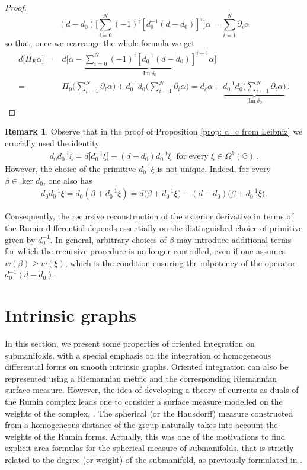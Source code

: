 \documentclass[dvipsnames]{amsart}
\theoremstyle{definition}
\newtheorem{remark}[theorem]{Remark}
\theoremstyle{definition}
\numberwithin{equation}{section}
\newcommand{\G}{\mathbb{G}}
\begin{document}
\begin{proof}
    $$(d-d_0)\big[\sum_{i=0}^N(-1)^i[d_0^{-1}(d-d_0)]^{i}\big]\alpha=\sum_{i=1}^N\partial_i\alpha$$
    so that, once we rearrange the whole formula we get
    \begin{align*}
        d\big[\Pi_E\alpha\big]=&d\bigg[\alpha-\underbrace{\sum_{i=0}^N(-1)^i[d_0^{-1}(d-d_0)]^{i+1}\alpha}_{\operatorname{Im}\delta_0}\bigg]\\=&\Pi_0\bigg(\sum_{i=1}^N\partial_i\alpha\bigg)+d_0^{-1}d_0\bigg(\sum_{i=1}^N\partial_i\alpha\bigg)=d_c\alpha+\underbrace{d_0^{-1}d_0\bigg(\sum_{i=1}^N\partial_i\alpha\bigg)}_{\operatorname{Im}\delta_0}\,.
    \end{align*}
\end{proof}

\begin{remark}
    Observe that in the proof of Proposition \ref{prop: d_c from Leibniz} we crucially used the identity
    \begin{align*}
        d_0d_0^{-1}\xi
        =
        d\big[d_0^{-1}\xi\big]
        -(d-d_0)d_0^{-1}\xi\ \text{ for every }\xi\in\Omega^k(\G)\,.
    \end{align*}
    However, the choice of the primitive \(d_0^{-1}\xi\) is not unique. Indeed, for every \(\beta\in\ker d_0\), one also has
    \begin{align*}
        d_0d_0^{-1}\xi
        =
        d_0(\beta+d_0^{-1}\xi)
        =
        d\big(\beta+d_0^{-1}\xi\big)
        -(d-d_0)\big(\beta+d_0^{-1}\xi\big).
    \end{align*}

    Consequently, the recursive reconstruction of the exterior derivative in terms of the Rumin differential depends essentially on the distinguished choice of primitive given by \(d_0^{-1}\). In general, arbitrary choices of \(\beta\) may introduce additional terms for which the recursive procedure is no longer controlled, even if one assumes \(w(\beta)\geq w(\xi)\), which is the condition ensuring the nilpotency of the operator \(d_0^{-1}(d-d_0)\).
\end{remark}

\section{Intrinsic graphs}\label{section intrinsic graphs}
In this section, we present some properties of oriented integration on submanifolds, with a special emphasis on the integration of homogeneous differential forms on smooth intrinsic graphs. Oriented integration can also be represented using a Riemannian metric and the corresponding Riemannian surface measure. However, the idea of developing a theory of currents as duals of the Rumin complex leads one to consider a surface measure modelled on the weights of the complex, \cite{DiMJulNGoloVit25,Vit22,Can21jga,FSSC6,Mag06}. 
The spherical (or the Hausdorff) measure constructed from a homogeneous distance of the group naturally takes into account the weights of the Rumin forms. Actually, this was one of the motivations to find explicit area formulas for the spherical measure of submanifolds, that is strictly related to the degree (or weight) of the submanifold, as previously formulated in \cite{Mag12A}.
\end{document}
